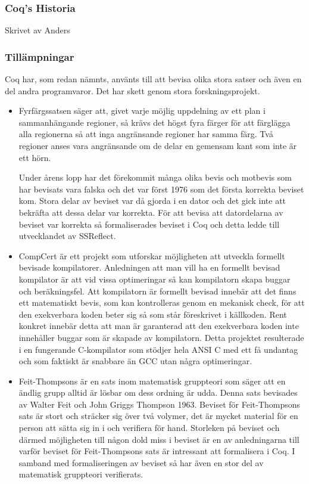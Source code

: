\subsubsection{Coq's Historia}
Skrivet av Anders

\subsubsection{Tillämpningar}
Coq har, som redan nämnts, använts till att bevisa olika stora satser och även
en del andra programvaror. Det har skett genom stora forskningsprojekt.

\begin{itemize}

\item Fyrfärgssatsen\autocite{gonthier2008formal} säger att, givet varje möjlig
uppdelning av ett plan i sammanhängande regioner, så krävs det högst fyra
färger för att färglägga alla regionerna så att inga angränsande regioner har
samma färg. Två regioner anses vara angränsande om de delar en gemensam kant
som inte är ett hörn.

Under årens lopp har det förekommit många olika bevis och motbevis som har
bevisats vara falska och  det var först 1976 som det första korrekta beviset
kom. Stora delar av beviset var då gjorda i en dator och det gick inte att
bekräfta att dessa delar var korrekta. För att bevisa att datordelarna av
beviset var korrekta så formaliserades beviset i Coq och detta ledde till
utvecklandet av SSReflect.

\item CompCert\autocite{compcert} är ett projekt som utforskar möjligheten att
utveckla formellt bevisade kompilatorer. Anledningen att man vill ha en
formellt bevisad kompilator är att vid vissa optimeringar så kan kompilatorn
skapa buggar och beräkningsfel. Att kompilatorn är formellt bevisad innebär att
det finns ett matematiskt bevis, som kan kontrolleras genom en mekanisk check,
för att den exekverbara koden beter sig så som står föreskrivet i källkoden.
Rent konkret innebär detta att man är garanterad att den exekverbara koden inte
innehåller buggar som är skapade av kompilatorn. Detta projektet resulterade i
en fungerande C-kompilator som stödjer hela ANSI C med ett få undantag och som
faktiskt är snabbare än GCC utan några optimeringar.

\item Feit-Thompsons är en sats inom matematisk gruppteori som säger att en
ändlig grupp alltid är lösbar om dess ordning är
udda\cite{aschbacher2004status}. Denna sats bevisades av Walter Feit och John
Griggs Thompson 1963. Beviset för Feit-Thompsons sats är stort och sträcker sig
över två volymer, det är mycket material för en person att sätta sig in i och
verifiera för hand. Storleken på beviset och därmed möjligheten till någon dold
miss i beviset är en av anledningarna till varför beviset för Feit-Thompsons
sats är intressant att formalisera i Coq. I samband med formaliseringen av
beviset så har även en stor del av matematisk gruppteori verifierats.

\end{itemize}

